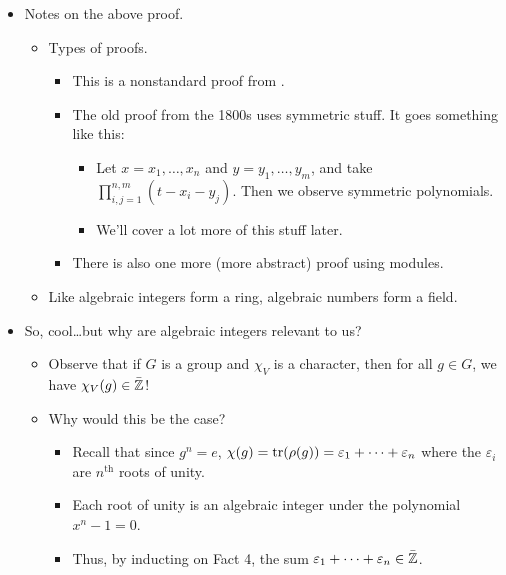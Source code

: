 \documentclass[../notes.tex]{subfiles}
\begin{document}
\begin{itemize}
\begin{proof}
        For sum, we take $A\otimes I_m+I_n\otimes B$ so that
        \begin{equation*}
            (A\otimes I_m+I_n\otimes B)(v\otimes w) = xv\otimes w+v\otimes yw
            = (x+y)v\otimes w
        \end{equation*}
        It follows by the two lines above and Fact 3 that $xy,x+y\in\bar{\Z}$, as desired.
    \end{proof}
    \item Notes on the above proof.
    \begin{itemize}
        \item Types of proofs.
        \begin{itemize}
            \item This is a nonstandard proof from \textcite{bib:Etingof}.
            \item The old proof from the 1800s uses symmetric stuff. It goes something like this:
            \begin{itemize}
                \item Let $x=x_1,\dots,x_n$ and $y=y_1,\dots,y_m$, and take $\prod_{i,j=1}^{n,m}(t-x_i-y_j)$. Then we observe symmetric polynomials.
                \item We'll cover a lot more of this stuff later.
            \end{itemize}
            \item There is also one more (more abstract) proof using modules.
        \end{itemize}
        \item Like algebraic integers form a ring, algebraic numbers form a field.
    \end{itemize}
    \item So, cool\dots but why are algebraic integers relevant to us?
    \begin{itemize}
        \item Observe that if $G$ is a group and $\chi_V$ is a character, then for all $g\in G$, we have $\chi_V(g)\in\bar{\mathbb{Z}}$!
        \item Why would this be the case?
        \begin{itemize}
            \item Recall that since $g^n=e$, $\chi(g)=\tr(\rho(g))=\varepsilon_1+\cdots+\varepsilon_n$ where the $\varepsilon_i$ are $n^\text{th}$ roots of unity.
            \item Each root of unity is an algebraic integer under the polynomial $x^n-1=0$.
            \item Thus, by inducting on Fact 4, the sum $\varepsilon_1+\cdots+\varepsilon_n\in\bar{\mathbb{Z}}$.

\end{itemize}
\end{itemize}
\end{itemize}
\end{document}
